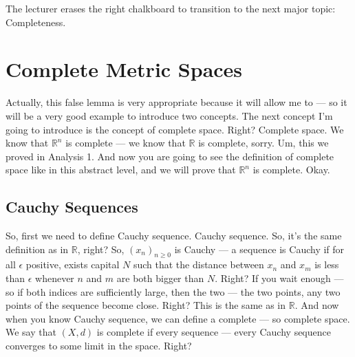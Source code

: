 \begin{meta-note}[Transition]
The lecturer erases the right chalkboard to transition to the next major topic: Completeness.
\end{meta-note}

\section*{Complete Metric Spaces}

\begin{spoken-clean}[00:15:51 - 00:17:20]
Actually, this false lemma is very appropriate because it will allow me to — so it will be a very good example to introduce two concepts. The next concept I'm going to introduce is the concept of complete space. Right? Complete space. We know that $\mathbb{R}^n$ is complete — we know that $\mathbb{R}$ is complete, sorry. Um, this we proved in Analysis 1. And now you are going to see the definition of complete space like in this abstract level, and we will prove that $\mathbb{R}^n$ is complete. Okay.
\end{spoken-clean}

\subsection*{Cauchy Sequences}

\begin{spoken-clean}[00:17:21 - 00:18:48]
So, first we need to define Cauchy sequence. Cauchy sequence.  So, it's the same definition as in $\mathbb{R}$, right? So, $(x_n)_{n \ge 0}$ is Cauchy — a sequence is Cauchy if for all $\epsilon$ positive, exists capital $N$ such that the distance between $x_n$ and $x_m$ is less than $\epsilon$ whenever $n$ and $m$ are both bigger than $N$. Right? If you wait enough --- so if both indices are sufficiently large, then the two --- the two points, any two points of the sequence become close. Right? This is the same as in $\mathbb{R}$. And now when you know Cauchy sequence, we can define a complete --- so complete space.  We say that $(X, d)$ is complete if every sequence --- every Cauchy sequence converges to some limit in the space. Right?
\end{spoken-clean}

